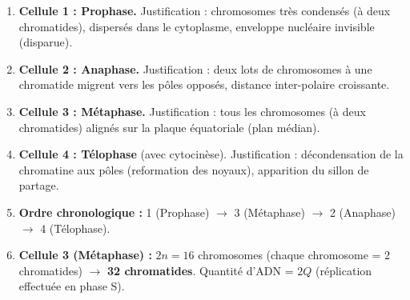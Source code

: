 \documentclass[11pt]{article}
\begin{document}
\begin{corrige}
\begin{enumerate}
\item \textbf{Cellule 1 : Prophase.} Justification : chromosomes très condensés (à deux chromatides), dispersés dans le cytoplasme, enveloppe nucléaire invisible (disparue).
\item \textbf{Cellule 2 : Anaphase.} Justification : deux lots de chromosomes à une chromatide migrent vers les pôles opposés, distance inter-polaire croissante.
\item \textbf{Cellule 3 : Métaphase.} Justification : tous les chromosomes (à deux chromatides) alignés sur la plaque équatoriale (plan médian).
\item \textbf{Cellule 4 : Télophase} (avec cytocinèse). Justification : décondensation de la chromatine aux pôles (reformation des noyaux), apparition du sillon de partage.

\item \textbf{Ordre chronologique :} 1 (Prophase) $\rightarrow$ 3 (Métaphase) $\rightarrow$ 2 (Anaphase) $\rightarrow$ 4 (Télophase).

\item \textbf{Cellule 3 (Métaphase) :} $2n = 16$ chromosomes (chaque chromosome = 2 chromatides) $\rightarrow$ \textbf{32 chromatides}. Quantité d'ADN = \textbf{$2Q$} (réplication effectuée en phase S).


\end{enumerate}
\end{corrige}
\end{document}
